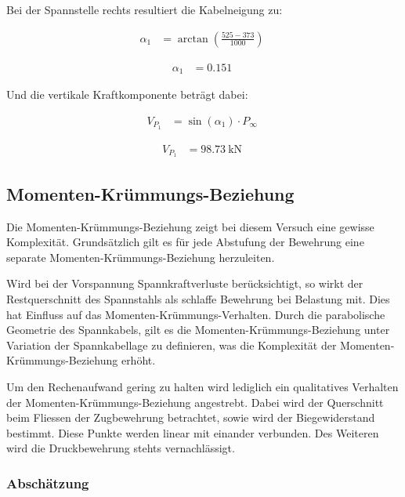 \documentclass[
  11pt,
  letterpaper,
]{scrreprt}
\begin{document}
Bei der Spannstelle rechts resultiert die Kabelneigung zu:

$$
\begin{aligned}
\alpha_{1} &= \operatorname{arctan} { \left( \frac{ 525 - 373 }{ 1000 } \right) } \; 
\end{aligned}
$$

$$
\begin{aligned}
\alpha_{1} &= 0.151 \;
\end{aligned}
$$

Und die vertikale Kraftkomponente beträgt dabei:

$$
\begin{aligned}
V_{P_{1}} &= \sin \left( \alpha_{1} \right) \cdot P_{\infty} \; 
\end{aligned}
$$

$$
\begin{aligned}
V_{P_{1}} &= 98.73\ \mathrm{kN} \;
\end{aligned}
$$

\subsection{Momenten-Krümmungs-Beziehung}\label{momenten-kruxfcmmungs-beziehung}

Die Momenten-Krümmungs-Beziehung zeigt bei diesem Versuch eine gewisse
Komplexität. Grundsätzlich gilt es für jede Abstufung der Bewehrung eine
separate Momenten-Krümmungs-Beziehung herzuleiten.

Wird bei der Vorspannung Spannkraftverluste berücksichtigt, so wirkt der
Restquerschnitt des Spannstahls als schlaffe Bewehrung bei Belastung
mit. Dies hat Einfluss auf das Momenten-Krümmungs-Verhalten. Durch die
parabolische Geometrie des Spannkabels, gilt es die
Momenten-Krümmungs-Beziehung unter Variation der Spannkabellage zu
definieren, was die Komplexität der Momenten-Krümmungs-Beziehung erhöht.

Um den Rechenaufwand gering zu halten wird lediglich ein qualitatives
Verhalten der Momenten-Krümmungs-Beziehung angestrebt. Dabei wird der
Querschnitt beim Fliessen der Zugbewehrung betrachtet, sowie wird der
Biegewiderstand bestimmt. Diese Punkte werden linear mit einander
verbunden. Des Weiteren wird die Druckbewehrung stehts vernachlässigt.

\subsubsection{Abschätzung}\label{abschuxe4tzung}
\end{document}
